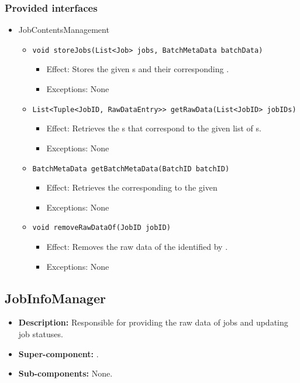 \subsubsection*{Provided interfaces}
\begin{itemize}
    \item JobContentsManagement
    \begin{itemize}
        \item \texttt{void storeJobs(List<Job> jobs, BatchMetaData batchData)}
        \begin{itemize}
            \item Effect: Stores the given s and their corresponding .
            \item Exceptions: None
        \end{itemize}

		\item \texttt{List<Tuple<JobID, RawDataEntry>> getRawData(List<JobID> jobIDs)}
        \begin{itemize}
            \item Effect: Retrieves the s that correspond to the given list of s.
            \item Exceptions: None
        \end{itemize}

        \item \texttt{BatchMetaData getBatchMetaData(BatchID batchID)}
		\begin{itemize}
            \item Effect: Retrieves the  corresponding to the given 
            \item Exceptions: None
        \end{itemize}

		\item \texttt{void removeRawDataOf(JobID jobID)}
		\begin{itemize}
            \item Effect: Removes the raw data of the  identified by .
            \item Exceptions: None
        \end{itemize}
    \end{itemize}
\end{itemize}

\subsection{JobInfoManager}
\begin{itemize}
    \item \textbf{Description:} Responsible for providing the raw data of jobs and updating job statuses.
    \item \textbf{Super-component:} .
    \item \textbf{Sub-components:} None.
\end{itemize}

